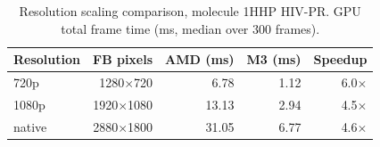 \begin{table}[H]
    \centering
    \small
    \begin{tabular}{lrrrr}
        \toprule
        Resolution & FB pixels & AMD (ms) & M3 (ms) & Speedup \\
        \midrule
        720p & 1280$\times$720 & 6.78 & 1.12 & 6.0$\times$ \\
        1080p & 1920$\times$1080 & 13.13 & 2.94 & 4.5$\times$ \\
        native & 2880$\times$1800 & 31.05 & 6.77 & 4.6$\times$ \\
        \bottomrule
    \end{tabular}
    \caption{Resolution scaling comparison, molecule 1HHP HIV-PR. GPU total frame time (ms, median over 300 frames).}
    \label{tab:compare_resolution}
\end{table}
